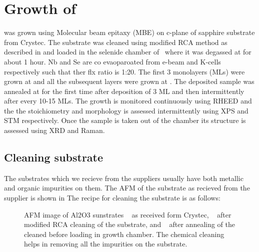

\section{Growth of \nbse}

\nbse was grown using Molecular beam epitaxy (MBE) on c-plane of sapphire substrate from Crystec. The substrate was 
cleaned using modified RCA method as described in  and loaded in the selenide chamber of \papaya\ 
where it was degassed at  for about 1 hour. Nb and Se are co evaoparoated from e-beam and K-cells respectively
such that ther flx ratio is 1:20. The first 3 monolayers (MLs) were grown at \temperature{570} and all the subsequent 
layers were grown at \temperature{650}. The deposited sample was annealed at \temperature{700} for the first time after 
deposition of 3 ML and then intermittently after every 10-15 MLs. The growth is monitored continuously using RHEED and the
the stoichiometry and morphology is assessed intermittently using XPS and STM respectively. Once the sample is taken out 
of the chamber its structure is assessed using XRD and Raman.


\subsection{Cleaning \alumina substrate}

The substrates which we recieve from the suppliers usually have both metallic and organic impurities on them. The AFM of
the substrate as recieved from the supplier is shown in \tref{afm-rec-al2o3} The recipe for cleaning the substrate is as follows:

\begin{figure}
   
    \centering
    \caption{
        AFM image of Al2O3 sunstrates 
        \sfA~ as received form Crystec, 
        \sfB~  after modified RCA cleaning of the substrate, and 
        \sfC~  after annealing of the cleaned before loading in growth chamber. 
        The chemical cleaning helps in removing all the impurities on the substrate.
    }
\end{figure}

